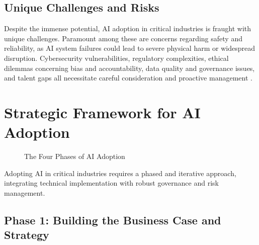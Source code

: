 \subsection{Unique Challenges and Risks}

Despite the immense potential, AI adoption in critical industries is fraught with unique challenges. Paramount among these are concerns regarding safety and reliability, as AI system failures could lead to severe physical harm or widespread disruption. Cybersecurity vulnerabilities, regulatory complexities, ethical dilemmas concerning bias and accountability, data quality and governance issues, and talent gaps all necessitate careful consideration and proactive management \parencite{dhs2024roles}.

\section{Strategic Framework for AI Adoption}

\begin{figure}[h]
\centering
{}
\caption{The Four Phases of AI Adoption}
\label{fig:adoption_flowchart}
\end{figure}

Adopting AI in critical industries requires a phased and iterative approach, integrating technical implementation with robust governance and risk management.



\subsection{Phase 1: Building the Business Case and Strategy}

